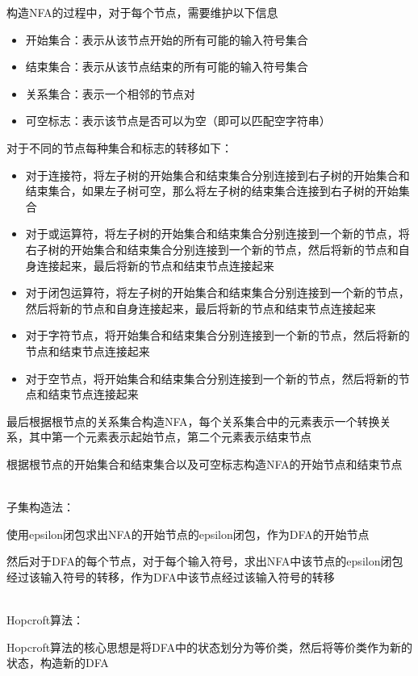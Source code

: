 \documentclass{hdureport}
\begin{document}
构造NFA的过程中，对于每个节点，需要维护以下信息
\begin{itemize}
    \item 开始集合：表示从该节点开始的所有可能的输入符号集合
    \item 结束集合：表示从该节点结束的所有可能的输入符号集合
    \item 关系集合：表示一个相邻的节点对
    \item 可空标志：表示该节点是否可以为空（即可以匹配空字符串）
\end{itemize}

对于不同的节点每种集合和标志的转移如下：
\begin{itemize}
    \item 对于连接符，将左子树的开始集合和结束集合分别连接到右子树的开始集合和结束集合，如果左子树可空，那么将左子树的结束集合连接到右子树的开始集合
    \item 对于或运算符，将左子树的开始集合和结束集合分别连接到一个新的节点，将右子树的开始集合和结束集合分别连接到一个新的节点，然后将新的节点和自身连接起来，最后将新的节点和结束节点连接起来
    \item 对于闭包运算符，将左子树的开始集合和结束集合分别连接到一个新的节点，然后将新的节点和自身连接起来，最后将新的节点和结束节点连接起来
    \item 对于字符节点，将开始集合和结束集合分别连接到一个新的节点，然后将新的节点和结束节点连接起来
    \item 对于空节点，将开始集合和结束集合分别连接到一个新的节点，然后将新的节点和结束节点连接起来
\end{itemize}

最后根据根节点的关系集合构造NFA，每个关系集合中的元素表示一个转换关系，其中第一个元素表示起始节点，第二个元素表示结束节点

根据根节点的开始集合和结束集合以及可空标志构造NFA的开始节点和结束节点

\quad \\

子集构造法：

使用epsilon闭包求出NFA的开始节点的epsilon闭包，作为DFA的开始节点

然后对于DFA的每个节点，对于每个输入符号，求出NFA中该节点的epsilon闭包经过该输入符号的转移，作为DFA中该节点经过该输入符号的转移

\quad \\

Hopcroft算法：

Hopcroft算法的核心思想是将DFA中的状态划分为等价类，然后将等价类作为新的状态，构造新的DFA
\end{document}
